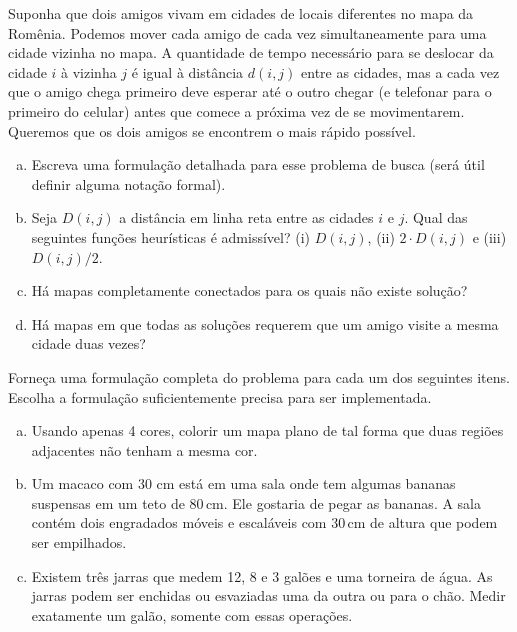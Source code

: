 \begin{exercise}
Suponha que dois amigos vivam em cidades de locais diferentes no mapa da Romênia. Podemos mover cada amigo de cada vez simultaneamente para uma cidade vizinha no mapa. A quantidade de tempo necessário para se deslocar da cidade $i$ à vizinha $j$ é igual à distância $d(i,j)$ entre as cidades, mas a cada vez que o amigo chega primeiro deve
esperar até o outro chegar (e telefonar para o primeiro do celular) antes que comece a próxima vez de se movimentarem. Queremos que os dois amigos se encontrem o mais rápido possível.

\begin{enumerate}[a.]
	\item Escreva uma formulação detalhada para esse problema de busca (será útil definir alguma notação formal).
	
	\item Seja $D(i,j)$ a distância em linha reta entre as cidades $i$ e $j$. Qual das seguintes funções heurísticas é admissível? (i) $D(i,j)$, (ii) $2 \cdot D(i,j)$ e (iii) $D(i,j) / 2$.
	
	\item Há mapas completamente conectados para os quais não existe solução?
	
	\item Há mapas em que todas as soluções requerem que um amigo visite a mesma cidade duas vezes?
\end{enumerate}
\end{exercise}

\begin{exercise}
Forneça uma formulação completa do problema para cada um dos seguintes itens. Escolha a formulação suficientemente precisa para ser implementada.

\begin{enumerate}[a.]
	\item Usando apenas 4 cores, colorir um mapa plano de tal forma que duas regiões adjacentes não tenham a mesma cor.
	
	\item Um macaco com 30 cm está em uma sala onde tem algumas bananas suspensas em um teto de 80\,cm. Ele gostaria de pegar as bananas. A sala contém dois engradados móveis e escaláveis com 30\,cm de altura que podem ser empilhados.
	
	\item Existem três jarras que medem 12, 8 e 3 galões e uma torneira de água. As jarras podem ser enchidas ou esvaziadas uma da outra ou para o chão. Medir exatamente um galão, somente com essas operações.
\end{enumerate}
\end{exercise}

